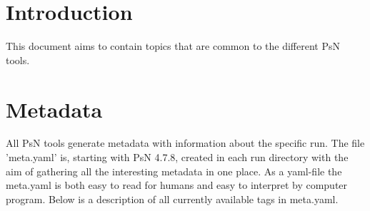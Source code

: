 

\usepackage{tabularx}





\maketitle
\newcommand{\guidetoolname}{<toolname>}

\section{Introduction}
This document aims to contain topics that are common to the different PsN tools.

\section{Metadata}
All PsN tools generate metadata with information about the specific run. The file 'meta.yaml' is, starting with PsN 4.7.8, created in each run directory with the aim of gathering all the interesting metadata in one place. As a yaml-file the meta.yaml is both easy to read for humans and easy to interpret by computer program. Below is a description of all currently available tags in meta.yaml.

